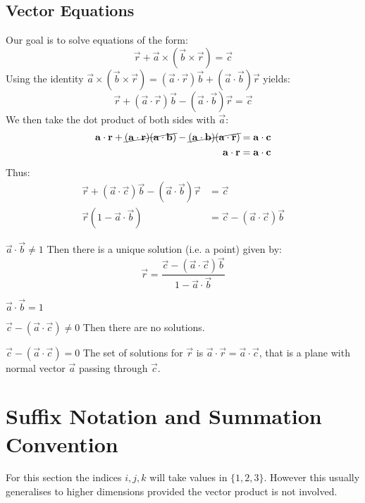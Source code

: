 \documentclass[../main.tex]{subfiles}
\begin{document}
\subsection{Vector Equations}
Our goal is to solve equations of the form:
\[
  \vec{r} + \vec{a} \times (\vec{b} \times \vec{r}) = \vec{c}
\]
Using the identity $\vec{a} \times (\vec{b} \times \vec{r}) = (\vec{a} \cdot \vec{r}) \vec{b} + (\vec{a} \cdot \vec{b})\vec{r}$ yields:
\[
  \vec{r} + (\vec{a} \cdot \vec{r})\vec{b} - (\vec{a} \cdot \vec{b})\vec{r} = \vec{c}
\]
We then take the dot product of both sides with $\vec{a}$:
\begin{align*}
  \vec{a} \cdot \vec{r} + \cancel{(\vec{a} \cdot \vec{r})(\vec{a} \cdot \vec{b})} - \cancel{(\vec{a} \cdot \vec{b})(\vec{a} \cdot \vec{r})} &= \vec{a} \cdot \vec{c} \\
  \vec{a} \cdot \vec{r} &= \vec{a} \cdot \vec{c}
\end{align*}
Thus:
\begin{align*}
  \vec{r} + (\vec{a} \cdot \vec{c})\vec{b} - (\vec{a} \cdot \vec{b})\vec{r} &= \vec{c} \\
  \vec{r}(1 - \vec{a} \cdot \vec{b}) &= \vec{c} - (\vec{a} \cdot \vec{c}) \vec{b}
\end{align*}
\begin{proofcases}
  \begin{case}{$\vec{a} \cdot \vec{b} \neq 1$}
    Then there is a unique solution (i.e. a point) given by:
    \[
      \vec{r} = \frac{\vec{c} - (\vec{a} \cdot \vec{c})\vec{b}}{1 - \vec{a} \cdot \vec{b}}
    \]
  \end{case}
  \begin{case}{$\vec{a} \cdot \vec{b} = 1$}
    \begin{proofcases}
      \begin{case}{$\vec{c} - (\vec{a} \cdot \vec{c}) \neq 0$}
        Then there are no solutions.
      \end{case}
      \begin{case}{$\vec{c} - (\vec{a} \cdot \vec{c}) = 0$}
        The set of solutions for $\vec{r}$ is $\vec{a} \cdot \vec{r} = \vec{a} \cdot \vec{c}$, that is a plane with normal vector $\vec{a}$ passing through $\vec{c}$.
      \end{case}
    \end{proofcases}
  \end{case}
\end{proofcases}

\section{Suffix Notation and Summation Convention}
\begin{remark}[Note]
  For this section the indices $i, j, k$ will take values in $\{1, 2, 3\}$.
  However this usually generalises to higher dimensions provided the vector product is not involved.
\end{remark}
\end{document}
